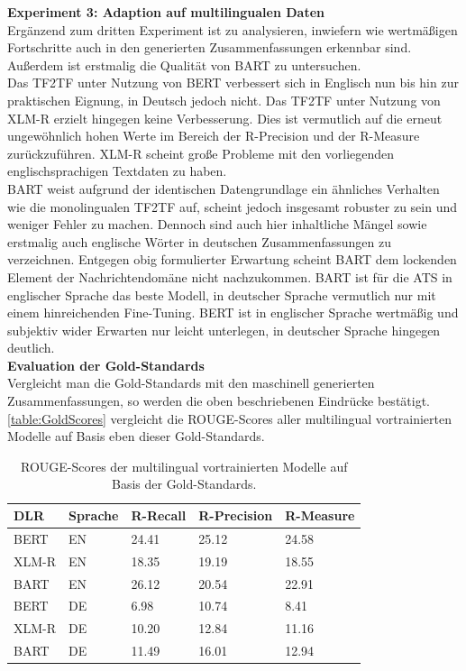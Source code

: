 \noindent
\textbf{Experiment 3: Adaption auf multilingualen Daten}\\
\noindent
Ergänzend zum dritten Experiment ist zu analysieren, inwiefern wie wertmäßigen Fortschritte auch in den generierten Zusammenfassungen erkennbar sind. Außerdem ist erstmalig die Qualität von \ac{BART} zu untersuchen.\\

\noindent
Das \ac{TF2TF} unter Nutzung von \ac{BERT} verbessert sich in Englisch nun bis hin zur praktischen Eignung, in Deutsch jedoch nicht. Das \ac{TF2TF} unter Nutzung von \ac{XLM-R} erzielt hingegen keine Verbesserung. Dies ist vermutlich auf die erneut ungewöhnlich hohen Werte im Bereich der R-Precision und der R-Measure zurückzuführen. \ac{XLM-R} scheint große Probleme mit den vorliegenden englischsprachigen Textdaten zu haben.\\

\noindent
\ac{BART} weist aufgrund der identischen Datengrundlage ein ähnliches Verhalten wie die monolingualen \ac{TF2TF} auf, scheint jedoch insgesamt robuster zu sein und weniger Fehler zu machen. Dennoch sind auch hier inhaltliche Mängel sowie erstmalig auch englische Wörter in deutschen Zusammenfassungen zu verzeichnen. Entgegen obig formulierter Erwartung scheint \ac{BART} dem lockenden Element der Nachrichtendomäne nicht nachzukommen. \ac{BART} ist für die \ac{ATS} in englischer Sprache das beste Modell, in deutscher Sprache vermutlich nur mit einem hinreichenden Fine-Tuning. \ac{BERT} ist in englischer Sprache wertmäßig und subjektiv wider Erwarten nur leicht unterlegen, in deutscher Sprache hingegen deutlich.\\

\noindent
\textbf{Evaluation der Gold-Standards}\\
\noindent
Vergleicht man die Gold-Standards mit den maschinell generierten Zusammenfassungen, so werden die oben beschriebenen Eindrücke bestätigt. \autoref{table:GoldScores} vergleicht die \ac{ROUGE}-Scores aller multilingual vortrainierten Modelle auf Basis eben dieser Gold-Standards. 

\begin{table}[htb]
\centering
\begin{tabular}{ | p{2.5cm} | p{2.5cm} | p{2.5cm} | p{2.5cm} | p{2.5cm} | }
\hline
\textbf{DLR} & \textbf{Sprache} & \textbf{R-Recall} & \textbf{R-Precision} & \textbf{R-Measure} \\
\hline
BERT & EN & 24.41 & 25.12 & 24.58 \\
\hline
XLM-R & EN & 18.35 & 19.19 & 18.55 \\
\hline
BART & EN & 26.12 & 20.54 & 22.91 \\
\hline
BERT & DE & 6.98 & 10.74 & 8.41 \\
\hline
XLM-R & DE & 10.20 & 12.84 & 11.16 \\
\hline
BART & DE & 11.49 & 16.01 & 12.94 \\
\hline
\end{tabular}
\caption{ROUGE-Scores der multilingual vortrainierten Modelle auf Basis der Gold-Standards.}
\label{table:GoldScores}
\end{table}
\newpage

